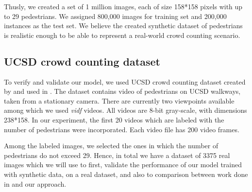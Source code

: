 \noindent Thusly, we created a set of 1 million images, each of size 158*158 pixels with up to 29 pedestrians. We assigned 800,000 images for training set and 200,000 instances as the test set. We believe the created synthetic dataset of pedestrians is realistic enough to be able to represent a real-world crowd counting scenario.

\subsection{UCSD crowd counting dataset}

To verify and validate our model, we used UCSD crowd counting dataset created by \citeauthor*{chan2008privacy} and used in \cite{chan2008privacy,chan2009bayesian,chan2012counting}. The dataset contains video of pedestrians on UCSD walkways, taken from a stationary camera. There are currently two  viewpoints  available among which we used \textit{vidf} videos. All videos are 8-bit gray-scale, with dimensions 238*158. In our experiment, the first 20 videos which are labeled with the number of pedestrians were incorporated. Each video file has 200 video frames. 

\indent Among the labeled images, we selected the ones in which the number of pedestrians do not exceed 29. Hence, in total we have a dataset of 3375 real images which we will use to first, validate the performance of our model trained with synthetic data, on a real dataset, and also to comparison between work done in \cite{chan2008privacy} and our approach. 
